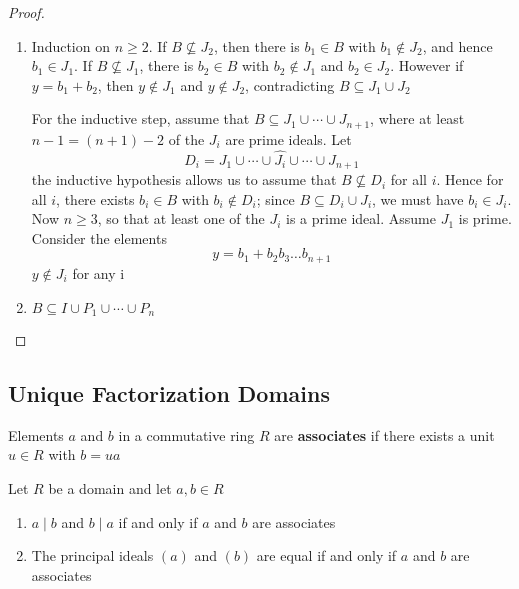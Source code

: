 \documentclass[11pt]{article}
\begin{document}
\begin{proof}
\begin{enumerate}
\item Induction on \(n\ge2\). If \(B\not\subseteq J_2\), then there is \(b_1\in B\)
with \(b_1\not\in J_2\), and hence \(b_1\in J_1\). If \(B\not\subseteq J_1\),
there is \(b_2\in B\) with \(b_2\not\in J_1\) and \(b_2\in J_2\). However if
\(y=b_1+b_2\), then \(y\not\in J_1\) and \(y\not\in J_2\), contradicting 
\(B\subseteq J_1\cup J_2\)

For the inductive step, assume that \(B\subseteq J_1\cup\cdots\cup J_{n+1}\),
where at least \(n-1=(n+1)-2\) of the \(J_i\) are prime ideals. Let
\begin{equation*}
D_i=J_1\cup\cdots\cup\widehat{J_i}\cup\cdots\cup J_{n+1}
\end{equation*}
the inductive hypothesis allows us to assume that \(B\not\subseteq D_i\) for
all \(i\). Hence for all \(i\), there exists \(b_i\in B\) with 
\(b_i\not\in D_i\); since \(B\subseteq D_i\cup J_i\), we must have 
\(b_i\in J_i\). Now \(n\ge3\), so that at least one of the \(J_i\) is a prime
ideal. Assume \(J_1\) is prime. Consider the elements
\begin{equation*}
y=b_1+b_2b_3\dots b_{n+1}
\end{equation*}
\(y\not\in J_i\) for any i
\item \(B\subseteq I\cup P_1\cup\cdots\cup P_n\)
\end{enumerate}
\end{proof}
\subsection{Unique Factorization Domains}
\label{sec:org3a532bc}
\begin{definition}[]
Elements \(a\) and \(b\) in a commutative ring \(R\) are \textbf{associates} if there exists
a unit \(u\in R\) with \(b=ua\)
\end{definition}

\begin{proposition}[]
Let \(R\) be a domain and let \(a,b\in R\)
\begin{enumerate}
\item \(a\mid b\) and \(b\mid a\) if and only if \(a\) and \(b\) are associates
\item The principal ideals \((a)\)  and \((b)\) are equal if and only if \(a\)
and \(b\) are associates
\end{enumerate}
\end{proposition}
\end{document}

